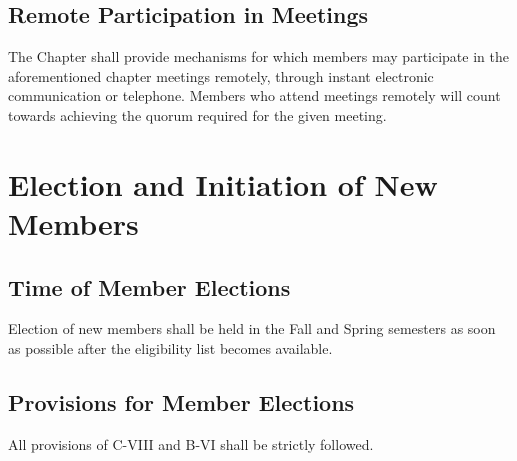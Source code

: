 \documentclass{article}
\begin{document}
	\subsection{Remote Participation in Meetings}
	The Chapter shall provide mechanisms for which members may participate in the aforementioned chapter meetings remotely, through instant electronic communication or telephone. Members who attend meetings remotely will count towards achieving the quorum required for the given meeting.

	\section{Election and Initiation of New Members}
	\subsection{Time of Member Elections}
	Election of new members shall be held in the Fall and Spring semesters as soon as possible after the eligibility list becomes available.
	\subsection{Provisions for Member Elections}
	All provisions of C-VIII and B-VI shall be strictly followed.
\end{document}
